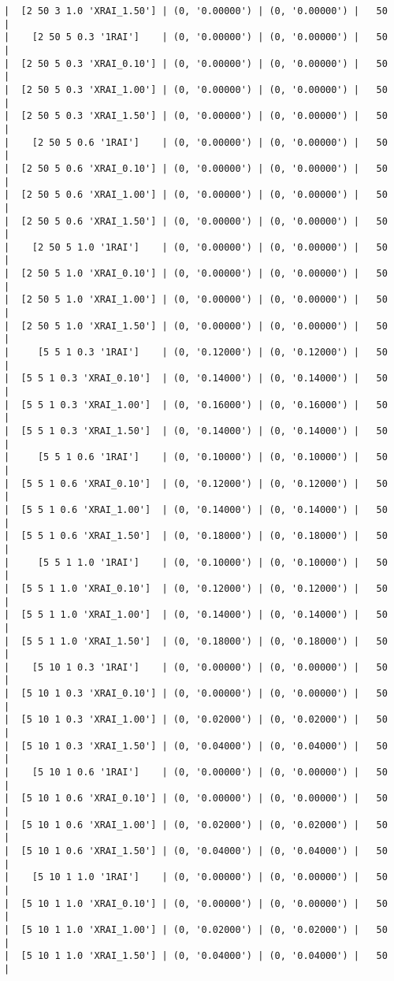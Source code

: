 \documentclass{article}
\begin{document}
\begin{verbatim}
|  [2 50 3 1.0 'XRAI_1.50'] | (0, '0.00000') | (0, '0.00000') |   50  |
|    [2 50 5 0.3 '1RAI']    | (0, '0.00000') | (0, '0.00000') |   50  |
|  [2 50 5 0.3 'XRAI_0.10'] | (0, '0.00000') | (0, '0.00000') |   50  |
|  [2 50 5 0.3 'XRAI_1.00'] | (0, '0.00000') | (0, '0.00000') |   50  |
|  [2 50 5 0.3 'XRAI_1.50'] | (0, '0.00000') | (0, '0.00000') |   50  |
|    [2 50 5 0.6 '1RAI']    | (0, '0.00000') | (0, '0.00000') |   50  |
|  [2 50 5 0.6 'XRAI_0.10'] | (0, '0.00000') | (0, '0.00000') |   50  |
|  [2 50 5 0.6 'XRAI_1.00'] | (0, '0.00000') | (0, '0.00000') |   50  |
|  [2 50 5 0.6 'XRAI_1.50'] | (0, '0.00000') | (0, '0.00000') |   50  |
|    [2 50 5 1.0 '1RAI']    | (0, '0.00000') | (0, '0.00000') |   50  |
|  [2 50 5 1.0 'XRAI_0.10'] | (0, '0.00000') | (0, '0.00000') |   50  |
|  [2 50 5 1.0 'XRAI_1.00'] | (0, '0.00000') | (0, '0.00000') |   50  |
|  [2 50 5 1.0 'XRAI_1.50'] | (0, '0.00000') | (0, '0.00000') |   50  |
|     [5 5 1 0.3 '1RAI']    | (0, '0.12000') | (0, '0.12000') |   50  |
|  [5 5 1 0.3 'XRAI_0.10']  | (0, '0.14000') | (0, '0.14000') |   50  |
|  [5 5 1 0.3 'XRAI_1.00']  | (0, '0.16000') | (0, '0.16000') |   50  |
|  [5 5 1 0.3 'XRAI_1.50']  | (0, '0.14000') | (0, '0.14000') |   50  |
|     [5 5 1 0.6 '1RAI']    | (0, '0.10000') | (0, '0.10000') |   50  |
|  [5 5 1 0.6 'XRAI_0.10']  | (0, '0.12000') | (0, '0.12000') |   50  |
|  [5 5 1 0.6 'XRAI_1.00']  | (0, '0.14000') | (0, '0.14000') |   50  |
|  [5 5 1 0.6 'XRAI_1.50']  | (0, '0.18000') | (0, '0.18000') |   50  |
|     [5 5 1 1.0 '1RAI']    | (0, '0.10000') | (0, '0.10000') |   50  |
|  [5 5 1 1.0 'XRAI_0.10']  | (0, '0.12000') | (0, '0.12000') |   50  |
|  [5 5 1 1.0 'XRAI_1.00']  | (0, '0.14000') | (0, '0.14000') |   50  |
|  [5 5 1 1.0 'XRAI_1.50']  | (0, '0.18000') | (0, '0.18000') |   50  |
|    [5 10 1 0.3 '1RAI']    | (0, '0.00000') | (0, '0.00000') |   50  |
|  [5 10 1 0.3 'XRAI_0.10'] | (0, '0.00000') | (0, '0.00000') |   50  |
|  [5 10 1 0.3 'XRAI_1.00'] | (0, '0.02000') | (0, '0.02000') |   50  |
|  [5 10 1 0.3 'XRAI_1.50'] | (0, '0.04000') | (0, '0.04000') |   50  |
|    [5 10 1 0.6 '1RAI']    | (0, '0.00000') | (0, '0.00000') |   50  |
|  [5 10 1 0.6 'XRAI_0.10'] | (0, '0.00000') | (0, '0.00000') |   50  |
|  [5 10 1 0.6 'XRAI_1.00'] | (0, '0.02000') | (0, '0.02000') |   50  |
|  [5 10 1 0.6 'XRAI_1.50'] | (0, '0.04000') | (0, '0.04000') |   50  |
|    [5 10 1 1.0 '1RAI']    | (0, '0.00000') | (0, '0.00000') |   50  |
|  [5 10 1 1.0 'XRAI_0.10'] | (0, '0.00000') | (0, '0.00000') |   50  |
|  [5 10 1 1.0 'XRAI_1.00'] | (0, '0.02000') | (0, '0.02000') |   50  |
|  [5 10 1 1.0 'XRAI_1.50'] | (0, '0.04000') | (0, '0.04000') |   50  |

\end{verbatim}
\end{document}
